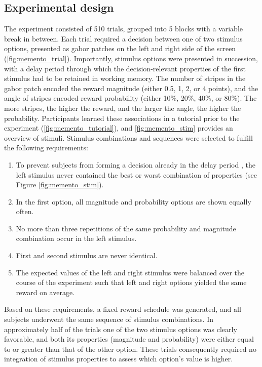 \subsection{Experimental design}

The experiment consisted of 510 trials, grouped into 5 blocks with a variable break in between.
Each trial required a decision between one of two stimulus options, presented as gabor patches on the left and right side of the screen (\cref{fig:memento_trial}).
Importantly, stimulus options were presented in succession, with a delay period through which the decision-relevant properties of the first stimulus had to be retained in working memory.
The number of stripes in the gabor patch encoded the reward magnitude (either 0.5, 1, 2, or 4 points), and the angle of stripes encoded reward probability (either 10\%, 20\%, 40\%, or 80\%).
The more stripes, the higher the reward, and the larger the angle, the higher the probability.
Participants learned these associations in a tutorial prior to the experiment (\cref{fig:memento_tutorial}), and \cref{fig:memento_stim} provides an overview of stimuli.
Stimulus combinations and sequences were selected to fulfill the following requirements:
\begin{enumerate}
	\item To prevent subjects from forming a decision already in the delay period \citep{curtis2010beyond}, the left stimulus never contained the best or worst combination of properties (see Figure \ref{fig:memento_stim}).
	\item In the first option, all magnitude and probability options are shown equally often.
	\item No more than three repetitions of the same probability and magnitude combination occur in the left stimulus.
	\item First and second stimulus are never identical.
	\item The expected values of the left and right stimulus were balanced over the course of the experiment such that left and right options yielded the same reward on average.
\end{enumerate}
Based on these requirements, a fixed reward schedule was generated, and all subjects underwent the same sequence of stimulus combinations.
In approximately half of the trials one of the two stimulus options was clearly favorable, and both its properties (magnitude and probability) were either equal to or greater than that of the other option.
These trials consequently required no integration of stimulus properties to assess which option's value is higher.
